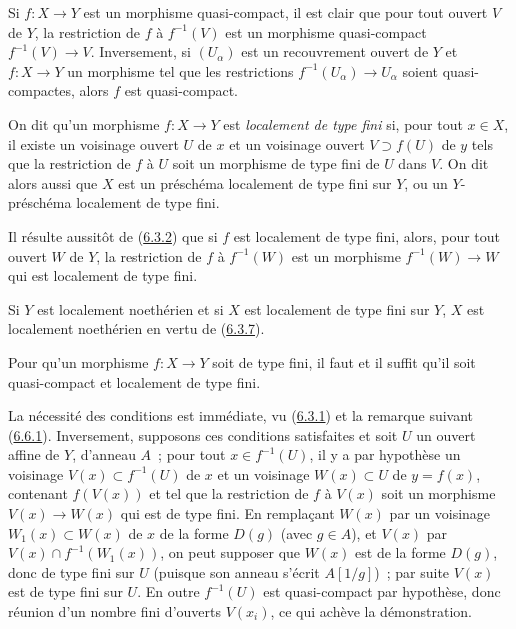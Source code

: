 Si $f:X\to Y$ est un morphisme quasi-compact, il est clair que pour tout
ouvert $V$ de $Y$, la restriction de $f$ à $f^{-1}(V)$ est un morphisme
quasi-compact $f^{-1}(V)\to V$. Inversement, si $(U_\alpha)$ est un
recouvrement ouvert de $Y$ et $f:X\to Y$ un morphisme tel que les restrictions
$f^{-1}(U_\alpha)\to U_\alpha$ soient quasi-compactes, alors $f$ est
quasi-compact.

\begin{definition}[6.6.2]
\label{I.6.6.2-fr}
On dit qu'un morphisme $f:X\to Y$ est \emph{localement de type fini} si, pour
tout $x\in X$, il existe un voisinage ouvert $U$ de $x$ et un voisinage ouvert
$V\supset f(U)$ de $y$ tels que la
restriction de $f$ à $U$ soit un morphisme de type fini de $U$ dans $V$. On
dit alors aussi que $X$ est un préschéma localement de type fini sur $Y$, ou
un $Y$-préschéma localement de type fini.
\end{definition}

Il résulte aussitôt de (\hyperref[I.6.3.2-fr]{6.3.2}) que si $f$ est
localement de type fini, alors, pour tout ouvert $W$ de $Y$, la restriction
de $f$ à $f^{-1}(W)$ est un morphisme $f^{-1}(W)\to W$ qui est localement de
type fini.

Si $Y$ est localement noethérien et si $X$ est localement de type fini sur
$Y$, $X$ est localement noethérien en vertu de
(\hyperref[I.6.3.7-fr]{6.3.7}).

\begin{proposition}[6.6.3]
\label{I.6.6.3-fr}
Pour qu'un morphisme $f:X\to Y$ soit de type fini, il faut et il suffit qu'il
soit quasi-compact et localement de type fini.
\end{proposition}

La nécessité des conditions est immédiate, vu
(\hyperref[I.6.3.1-fr]{6.3.1}) et la remarque suivant
(\hyperref[I.6.6.1-fr]{6.6.1}). Inversement, supposons ces conditions
satisfaites et soit $U$ un ouvert affine de $Y$, d'anneau $A$~; pour tout
$x\in f^{-1}(U)$, il y a par hypothèse un voisinage
$V(x)\subset f^{-1}(U)$ de $x$ et un voisinage $W(x)\subset U$ de
$y=f(x)$, contenant $f(V(x))$ et tel que la restriction de $f$ à $V(x)$ soit
un morphisme $V(x)\to W(x)$ qui est de type fini. En remplaçant $W(x)$ par
un voisinage $W_1(x)\subset W(x)$ de $x$ de la forme $D(g)$ (avec $g\in A$),
et $V(x)$ par $V(x)\cap f^{-1}(W_1(x))$, on peut supposer que $W(x)$ est de
la forme $D(g)$, donc de type fini sur $U$ (puisque son anneau s'écrit
$A[1/g]$)~; par suite $V(x)$ est de type fini sur $U$. En outre
$f^{-1}(U)$ est quasi-compact par hypothèse, donc réunion d'un nombre fini
d'ouverts $V(x_i)$, ce qui achève la démonstration.

